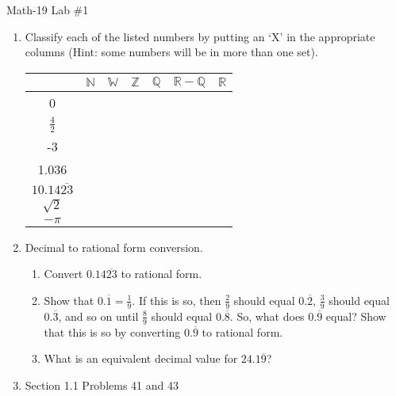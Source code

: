 \documentclass[letterpaper,12pt,fleqn]{article}
\begin{document}
\begin{center}
\Large Math-19 Lab \#1
\end{center}

\vspace{0.5in}

\begin{enumerate}
\item Classify each of the listed numbers by putting an `X' in the appropriate
columns (Hint: some numbers will be in more than one set).

\begin{tabular}{|c|c|c|c|c|c|c|}
\hline
 & $\mathbb{N}$ & $\mathbb{W}$ & $\mathbb{Z}$ & $\mathbb{Q}$ &
    $\mathbb{R}-\mathbb{Q}$ & $\mathbb{R}$ \\
\hline
0 & & & & & & \\
\hline
$\frac{4}{2}$ & & & & & & \\
\hline
-3 & & & & & & \\
\hline
1.036 & & & & & & \\
\hline
$10.14\overline{23}$ & & & & & & \\
\hline
$\sqrt{2}$ & & & & & & \\
\hline
$-\pi$ & & & & & & \\
\hline
\end{tabular}

\item Decimal to rational form conversion.
\begin{enumerate}
\item Convert $0.14\overline{23}$ to rational form.

\item Show that $0.\overline{1} = \frac{1}{9}$. If this is so, then
$\frac{2}{9}$ should equal $0.\overline{2}$,
$\frac{3}{9}$ should equal $0.\overline{3}$,
and so on until $\frac{8}{9}$ should equal $0.\overline{8}$. So, what does
$0.\overline{9}$ equal? Show that this is so by converting
$0.\overline{9}$ to rational form.

\item What is an equivalent decimal value for $24.1\overline{9}$?
\end{enumerate}

\item Section 1.1 Problems 41 and 43

\end{enumerate}
\end{document}
